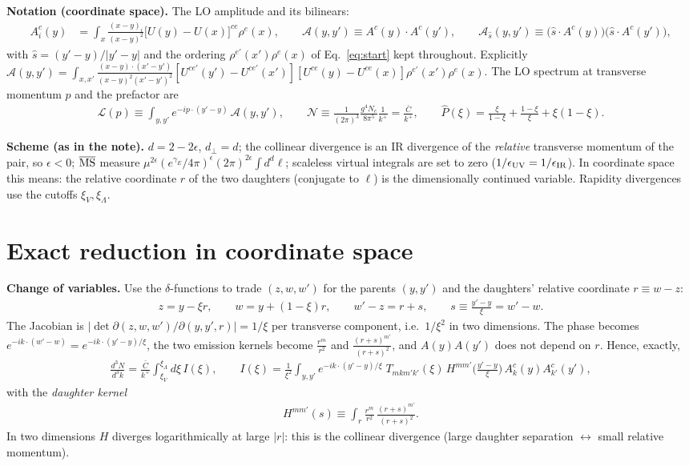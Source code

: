 \documentclass[10pt]{article}
\newcommand{\Lc}{\mathcal L}
\newcommand{\Ac}{\mathcal A}
\newcommand{\Nn}{\mathcal N}
\newcommand{\Ph}{\hat P}
\begin{document}
\textbf{Notation (coordinate space).} The LO amplitude and its bilinears:
\begin{align}
A^{c}_{i}(y)&=\int_x\frac{(x-y)_i}{(x-y)^{2}}\big[U(y)-U(x)\big]^{ce}\rho^{e}(x),\qquad
\Ac(y,y')\equiv A^{c}(y)\!\cdot\!A^{c}(y'),\qquad
\Ac_{\hat s}(y,y')\equiv\big(\hat s\!\cdot\!A^{c}(y)\big)\big(\hat s\!\cdot\!A^{c}(y')\big),
\end{align}
with $\hat s=(y'-y)/|y'-y|$ and the ordering $\rho^{e'}(x')\rho^{e}(x)$ of Eq.~\eqref{eq:start}
kept throughout. Explicitly
$\Ac(y,y')=\int_{x,x'}\frac{(x-y)\cdot(x'-y')}{(x-y)^{2}(x'-y')^{2}}[U^{ce'}(y')-U^{ce'}(x')][U^{ce}(y)-U^{ce}(x)]\rho^{e'}(x')\rho^{e}(x)$.
The LO spectrum at transverse momentum $p$ and the prefactor are
\begin{align}
\Lc(p)\equiv\int_{y,y'}e^{-ip\cdot(y'-y)}\,\Ac(y,y'),\qquad
\Nn\equiv\frac{1}{(2\pi)^{3}}\frac{g^{4}N_{c}}{8\pi^{5}}\frac{1}{k^{+}}=\frac{\bar C}{k^{+}},\qquad
\Ph(\xi)=\frac{\xi}{1-\xi}+\frac{1-\xi}{\xi}+\xi(1-\xi).
\end{align}

\textbf{Scheme (as in the note).} $d=2-2\epsilon$, $d_\perp=d$; the collinear divergence is an
IR divergence of the \emph{relative} transverse momentum of the pair, so $\epsilon<0$;
$\overline{\rm MS}$ measure $\mu^{2\epsilon}(e^{\gamma_E}/4\pi)^{\epsilon}(2\pi)^{2\epsilon}\int d^{d}\ell$;
scaleless virtual integrals are set to zero ($1/\epsilon_{\rm UV}=1/\epsilon_{\rm IR}$). In
coordinate space this means: the relative coordinate $r$ of the two daughters (conjugate to
$\ell$) is the dimensionally continued variable. Rapidity divergences use the cutoffs
$\xi_V,\xi_\Lambda$.

\section{Exact reduction in coordinate space}
\textbf{Change of variables.} Use the $\delta$-functions to trade $(z,w,w')$ for the parents
$(y,y')$ and the daughters' relative coordinate $r\equiv w-z$:
\begin{align}
z=y-\xi r,\qquad w=y+(1-\xi)r,\qquad w'-z=r+s,\qquad s\equiv\frac{y'-y}{\xi}=w'-w.
\end{align}
The Jacobian is $|\det\partial(z,w,w')/\partial(y,y',r)|=1/\xi$ per transverse component, i.e.\
$1/\xi^{2}$ in two dimensions. The phase becomes $e^{-ik\cdot(w'-w)}=e^{-ik\cdot(y'-y)/\xi}$, the
two emission kernels become $\frac{r^{m}}{r^{2}}$ and $\frac{(r+s)^{m'}}{(r+s)^{2}}$, and
$A(y)A(y')$ does not depend on $r$. Hence, exactly,
\begin{align}\label{eq:Ixi}
\frac{d^{3}N}{d^{3}k}=\frac{\bar C}{k^{+}}\int_{\xi_V}^{\xi_\Lambda}\!d\xi\,I(\xi),\qquad
I(\xi)=\frac{1}{\xi^{2}}\int_{y,y'}e^{-ik\cdot(y'-y)/\xi}\;T_{mkm'k'}(\xi)\,H^{mm'}\Big(\frac{y'-y}{\xi}\Big)\,A^{c}_{k}(y)A^{c}_{k'}(y'),
\end{align}
with the \emph{daughter kernel}
\begin{align}
H^{mm'}(s)\equiv\int_{r}\frac{r^{m}}{r^{2}}\,\frac{(r+s)^{m'}}{(r+s)^{2}}.
\end{align}
In two dimensions $H$ diverges logarithmically at large $|r|$: this is the collinear divergence
(large daughter separation $\leftrightarrow$ small relative momentum).
\end{document}
